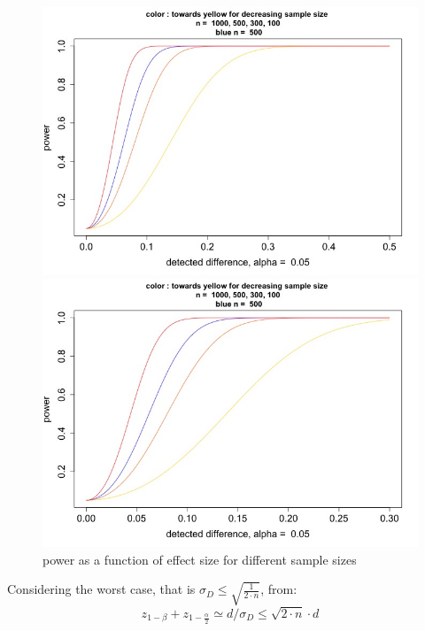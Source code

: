 \documentclass[14pt]{article}
\begin{document}
\begin{figure}[h!]
\centering
\begin{minipage}{0.4\textwidth}
\includegraphics[scale=0.2]{plots/plot_power colore size 1.jpg}  
\end{minipage}
\begin{minipage}{0.4\textwidth}
\includegraphics[scale=0.2]{plots/plot_power colore size 2.jpg}  
\end{minipage}
\caption{power as a function of effect size for different sample sizes}
\label{fig:power n}
\end{figure}
Considering the worst case, that is $\sigma_{D}\leq\sqrt{\frac{1}{2\cdot n}} $, from:
\begin{equation}
z_{1-\beta}+z_{1-\frac{\alpha}{2}} \simeq  d/\sigma_{D}\leq  \sqrt{2\cdot n}\cdot d
\end{equation}
\end{document}
